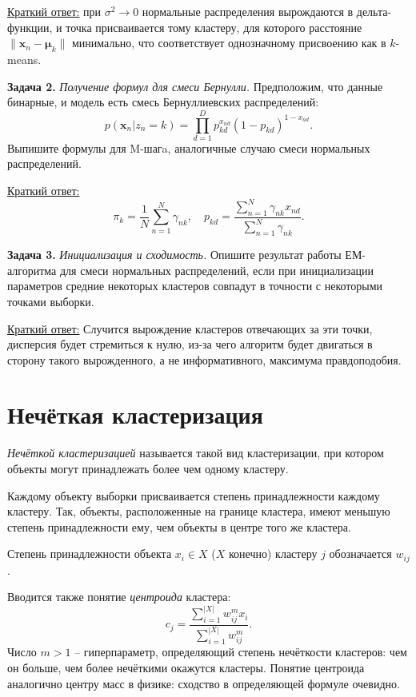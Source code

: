 \underline{Краткий ответ:} при $\sigma^2 \to 0$ нормальные распределения вырождаются в дельта-функции, и точка присваивается тому кластеру, для которого расстояние $\|\mathbf{x}_n - \boldsymbol{\mu}_k\|$ минимально, что соответствует однозначному присвоению как в $k$-means.

\noindent\textbf{Задача 2.} \emph{Получение формул для смеси Бернулли.}
Предположим, что данные бинарные, и модель есть смесь Бернуллиевских распределений:
\begin{equation*}
    p(\mathbf{x}_n | z_n = k) = \prod_{d=1}^D p_{kd}^{x_{nd}}(1 - p_{kd})^{1-x_{nd}}.
\end{equation*}
Выпишите формулы для M-шагa, аналогичные случаю смеси нормальных распределений.

\underline{Краткий ответ:}
\begin{equation*}
    \pi_k = \frac{1}{N}\sum_{n=1}^N \gamma_{nk}, \quad p_{kd} = \frac{\sum_{n=1}^N \gamma_{nk} x_{nd}}{\sum_{n=1}^N \gamma_{nk}}.
\end{equation*}

\noindent\textbf{Задача 3.} \emph{Инициализация и сходимость.}
Опишите результат работы ЕМ-алгоритма для смеси нормальных распределений, если при инициализации параметров средние некоторых кластеров совпадут в точности с некоторыми точками выборки.

\underline{Краткий ответ:} Случится вырождение кластеров отвечающих за эти точки, дисперсия будет стремиться к нулю, из-за чего алгоритм будет двигаться в сторону такого вырожденного, а не информативного, максимума правдоподобия.


\section{Нечёткая кластеризация}

\textit{Нечёткой кластеризацией} называется такой вид кластеризации, при котором объекты могут
принадлежать более чем одному кластеру.

Каждому объекту выборки присваивается степень принадлежности каждому кластеру. Так, объекты,
расположенные на границе кластера, имеют меньшую степень принадлежности ему, чем объекты в центре
того же кластера.

Степень принадлежности объекта $x_i \in X$ ($X$ конечно) кластеру $j$ обозначается $w_{ij}$.

Вводится также понятие \textit{центроида} кластера:
\begin{equation}\label{fuzzy-clustering-centroid}
    c_j = \frac{\sum\limits_{i = 1}^{|X|} w_{ij}^{m} x_i}{\sum\limits_{i = 1}^{|X|} w_{ij}^{m}}.
\end{equation}
Число $m > 1$ -- гиперпараметр, определяющий степень нечёткости кластеров: чем он больше, чем более
нечёткими окажутся кластеры. Понятие центроида аналогично центру масс в физике: сходство в
определяющей формуле очевидно.

